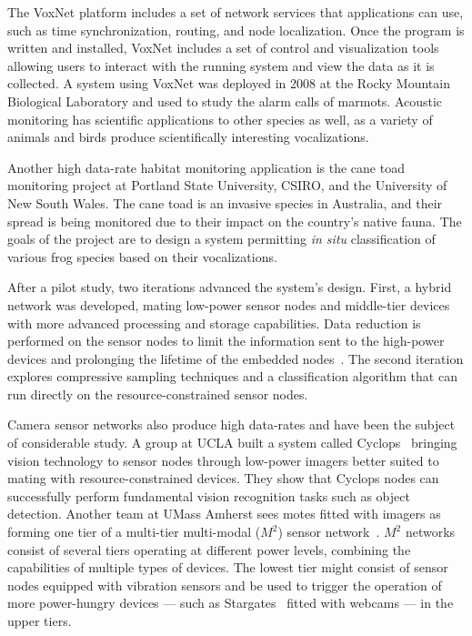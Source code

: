 The VoxNet platform includes a set of network services that applications can
use, such as time synchronization, routing, and node localization. Once the
program is written and installed, VoxNet includes a set of control and
visualization tools allowing users to interact with the running system and
view the data as it is collected. A system using VoxNet was deployed in 2008
at the Rocky Mountain Biological Laboratory and used to study the alarm calls
of marmots. Acoustic monitoring has scientific applications to other species
as well, as a variety of animals and birds produce scientifically interesting
vocalizations.

Another high data-rate habitat monitoring application is the cane toad
monitoring project at Portland State University, CSIRO, and the University of
New South Wales. The cane toad is an invasive species in Australia, and their
spread is being monitored due to their impact on the country's native fauna.
The goals of the project are to design a system permitting \textit{in situ}
classification of various frog species based on their vocalizations.

After a pilot study, two iterations advanced the system's design. First, a
hybrid network was developed, mating low-power sensor nodes and middle-tier
devices with more advanced processing and storage capabilities. Data
reduction is performed on the sensor nodes to limit the information sent to
the high-power devices and prolonging the lifetime of the embedded
nodes~\cite{canetoad-tosn}. The second iteration explores compressive
sampling techniques and a classification algorithm that can run directly on
the resource-constrained sensor nodes.

Camera sensor networks also produce high data-rates and have been the subject
of considerable study. A group at UCLA built a system called
Cyclops~\cite{cyclops-sensys05} bringing vision technology to sensor nodes
through low-power imagers better suited to mating with resource-constrained
devices. They show that Cyclops nodes can successfully perform fundamental
vision recognition tasks such as object detection. Another team at UMass
Amherst sees motes fitted with imagers as forming one tier of a multi-tier
multi-modal ($M^2$) sensor network~\cite{m2-nossdav05}. $M^2$ networks
consist of several tiers operating at different power levels, combining the
capabilities of multiple types of devices. The lowest tier might consist of
sensor nodes equipped with vibration sensors and be used to trigger the
operation of more power-hungry devices --- such as Stargates~\cite{stargate}
fitted with webcams --- in the upper tiers.


